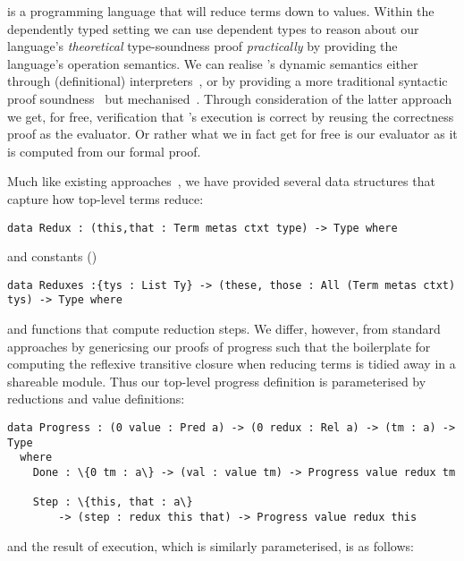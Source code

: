 
\Velo{} is a programming language that will reduce terms down to values.
Within the dependently typed setting we can use dependent types to reason about our language's \emph{theoretical} type-soundness proof \emph{practically} by providing the language's operation semantics.
We can realise \Velo{}'s dynamic semantics either through (definitional) interpreters~\cite{10.1145/3093333.3009866,Augustsson1999edt}, or by providing a more traditional syntactic proof soundness~\cite{DBLP:journals/iandc/WrightF94} but mechanised~\cite[Part 2: Properties]{plfa22.08}.
Through consideration of the latter approach we get, for free, verification that \Velo{}'s execution is correct by reusing the correctness proof as the evaluator.
Or rather what we in fact get for free is our evaluator as it is computed from our formal proof.

Much like existing approaches~\cite[Part 2: Properties]{plfa22.08}, we have provided several data structures that capture how top-level terms reduce:

\begin{Verbatim}
data Redux : (this,that : Term metas ctxt type) -> Type where
\end{Verbatim}

\noindent
and constants ()

\begin{Verbatim}
data Reduxes :{tys : List Ty} -> (these, those : All (Term metas ctxt) tys) -> Type where
\end{Verbatim}

\noindent
and functions that compute reduction steps.
We differ, however, from standard approaches by genericsing our proofs of progress such that the boilerplate for computing the reflexive transitive closure when reducing terms is tidied away in a shareable module.
Thus our top-level progress definition is parameterised by reductions and value definitions:

\begin{Verbatim}
data Progress : (0 value : Pred a) -> (0 redux : Rel a) -> (tm : a) -> Type
  where
    Done : \{0 tm : a\} -> (val : value tm) -> Progress value redux tm

    Step : \{this, that : a\}
        -> (step : redux this that) -> Progress value redux this
\end{Verbatim}

\noindent
and the result of execution, which is similarly parameterised, is as follows:

